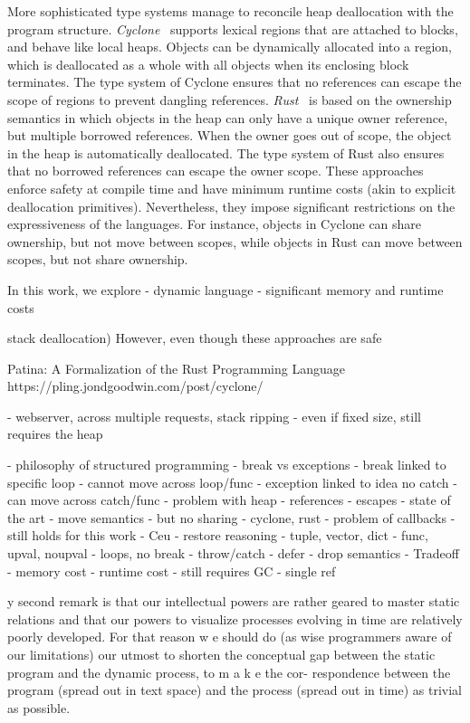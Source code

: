 \documentclass[12pt]{article}
\begin{document}
More sophisticated type systems manage to reconcile heap deallocation with the
program structure.
%
\emph{Cyclone}~\cite{TODO} supports lexical regions that are attached to
blocks, and behave like local heaps.
Objects can be dynamically allocated into a region, which is deallocated as a
whole with all objects when its enclosing block terminates.
The type system of Cyclone ensures that no references can escape the scope of
regions to prevent dangling references.
%
\emph{Rust}~\cite{TODO} is based on the ownership semantics in which objects
in the heap can only have a unique owner reference, but multiple borrowed
references.
When the owner goes out of scope, the object in the heap is automatically
deallocated.
The type system of Rust also ensures that no borrowed references can escape the
owner scope.
%
These approaches enforce safety at compile time and have minimum runtime costs
(akin to explicit deallocation primitives).
Nevertheless, they impose significant restrictions on the expressiveness of the
languages.
For instance, objects in Cyclone can share ownership, but not move between
scopes, while objects in Rust can move between scopes, but not share ownership.

In this work, we explore
- dynamic language
- significant memory and runtime costs




stack deallocation)
However, even though these approaches are safe 


Patina: A Formalization of the Rust Programming Language
https://pling.jondgoodwin.com/post/cyclone/

- webserver, across multiple requests, stack ripping
    - even if fixed size, still requires the heap

- philosophy of structured programming
    - break vs exceptions
        - break linked to specific loop
            - cannot move across loop/func
        - exception linked to idea no catch
            - can move across catch/func
- problem with heap
    - references
    - escapes
- state of the art
    - move semantics
    - but no sharing
    - cyclone, rust
        - problem of callbacks
            - still holds for this work
- Ceu
    - restore reasoning
    - tuple, vector, dict
    - func, upval, noupval
    - loops, no break
    - throw/catch
    - defer
    - drop semantics
- Tradeoff
    - memory cost
    - runtime cost
    - still requires GC
    - single ref

 y second remark is that our intellectual powers are rather
geared to master static relations and that our powers to visualize
processes evolving in time are relatively poorly developed. For
that reason w e should do (as wise programmers aware of our
limitations) our utmost to shorten the conceptual gap between
the static program and the dynamic process, to m a k e the cor-
respondence between the program (spread out in text space) and
the process (spread out in time) as trivial as possible.
\end{document}
